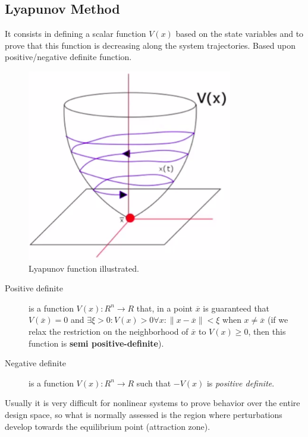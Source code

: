 \subsection*{Lyapunov Method}

It consists in defining a scalar function $V\left( x \right) $ based on the state variables and to prove that this function is decreasing along the system trajectories. Based upon positive/negative definite function.

\begin{figure}[h!]
    \centering
    \includegraphics[width=0.8\textwidth]{figures/lyapunov_function.png}
    \caption{Lyapunov function illustrated.}
    \label{fig:figures-lyapunov_function-png}
\end{figure}

\begin{description}
    \item[Positive definite] is a function $V\left( x \right) :R^{n}\to R$ that, in a point $\overline{x}$ is guaranteed that $V\left( \overline{x} \right) =0$ and  $\exists \xi>0:V\left( x \right) >0 \forall x:\|x-\overline{x}\|<\xi$ when $x\neq \overline{x}$ (if we relax the restriction on the neighborhood of $\overline{x}$ to $V(x) \ge 0$, then this function is \textbf{semi positive-definite}).
    \item[Negative definite] is a function $V\left( x \right) :R^{n}\to R$ such that $-V(x)$ is \emph{positive definite}.
\end{description}

Usually it is very difficult for nonlinear systems to prove behavior over the entire design space, so what is normally assessed is the region where perturbations develop towards the equilibrium point (attraction zone).

